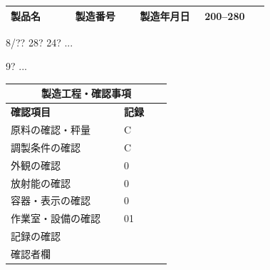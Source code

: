 \documentclass[UTF8,10pt,a4paper,fontset=fandol]{ctexart}
\newcommand{\fieldvalue}[1]{#1}
\newcommand{\handwritten}[1]{#1}
\begin{document}
\begin{center}
\begin{tabular}{|p{0.18\linewidth}|p{0.18\linewidth}|p{0.18\linewidth}|p{0.18\linewidth}|}
\hline
製品名 & 製造番号 & 製造年月日 & 200--280\\
\hline
\end{tabular}
\end{center}

\fieldvalue{\handwritten{8/?? 28?}}
\qquad
\fieldvalue{\handwritten{24? ...}}

\vspace{0.5em}

\fieldvalue{\handwritten{9? ...}}

\begin{center}
\begin{tabular}{|p{0.62\linewidth}|p{0.26\linewidth}|}
\hline
\multicolumn{2}{|c|}{製造工程・確認事項}\\
\hline
\textbf{確認項目} & \textbf{記録}\\
\hline
原料の確認・秤量 & 
\fieldvalue{\handwritten{C}}\\
\hline
調製条件の確認 & 
\fieldvalue{\handwritten{C}}\\
\hline
外観の確認 & 
\fieldvalue{\handwritten{0}}\\
\hline
放射能の確認 & 
\fieldvalue{\handwritten{0}}\\
\hline
容器・表示の確認 & 
\fieldvalue{\handwritten{0}}\\
\hline
作業室・設備の確認 & 
\fieldvalue{\handwritten{01}}\\
\hline
記録の確認 & \\
\hline
確認者欄 & \\
\hline
\end{tabular}
\end{center}
\end{document}
